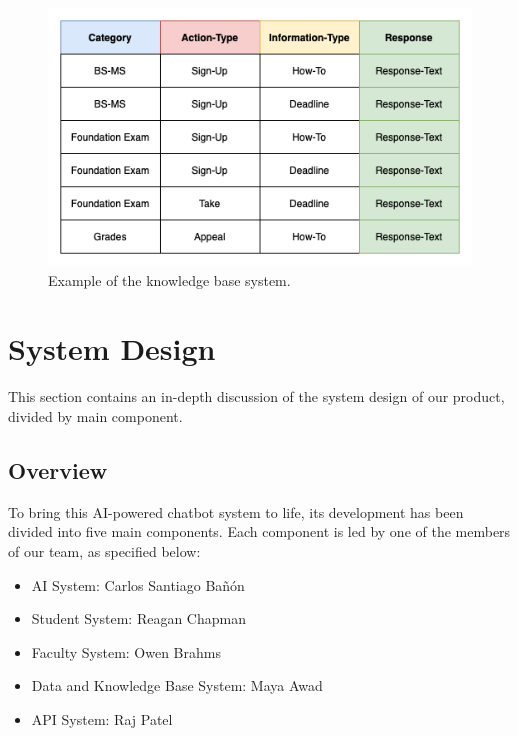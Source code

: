 \documentclass[titlepage, 12pt]{article}
\begin{document}
\begin{figure}[h]
    \centering\includegraphics[width=1\linewidth]{images/knowledge-base.png}
    \caption{Example of the knowledge base system.}
\end{figure}












\pagebreak


\section{System Design}

This section contains an in-depth discussion of the system design of our product, divided by main component.

\subsection{Overview}

To bring this AI-powered chatbot system to life, its development has been divided into five main components. Each component is led by one of the members of our team, as specified below:

\begin{itemize}
    \item AI System: Carlos Santiago Bañón
    \item Student System: Reagan Chapman
    \item Faculty System: Owen Brahms
    \item Data and Knowledge Base System: Maya Awad
    \item API System: Raj Patel
\end{itemize}
\end{document}
